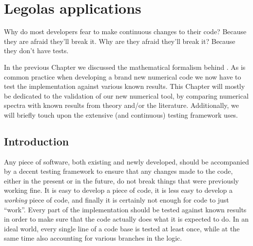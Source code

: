 \chapter{Legolas applications} \label{ch: legolas_applications}


\graphicspath{{05-applying_legolas/figures/}}

\begin{chapterquote}
  Why do most developers fear to make continuous changes to their code? Because they are afraid they'll break it.
  Why are they afraid they'll break it? Because they don't have tests.
\end{chapterquote}


In the previous Chapter we discussed the mathematical formalism behind {\legolas}. As is common practice when developing a brand new numerical code we now have to test the implementation against various known results. This Chapter will mostly be dedicated to the validation of our new numerical tool, by comparing numerical spectra with known results from theory and/or the literature. Additionally, we will briefly touch upon the extensive (and continuous) testing framework {\legolas} uses.

\section{Introduction}
Any piece of software, both existing and newly developed, should be accompanied by a decent testing framework to ensure that any changes made to the code, either in the present or in the future, do not break things that were previously working fine. It is easy to develop a piece of code, it is less easy to develop a \emph{working} piece of code, and finally it is certainly not enough for code to just ``work''. Every part of the implementation should be tested against known results in order to make sure that the code actually does what it is expected to do. In an ideal world, every single line of a code base is tested at least once, while at the same time also accounting for various branches in the logic.

